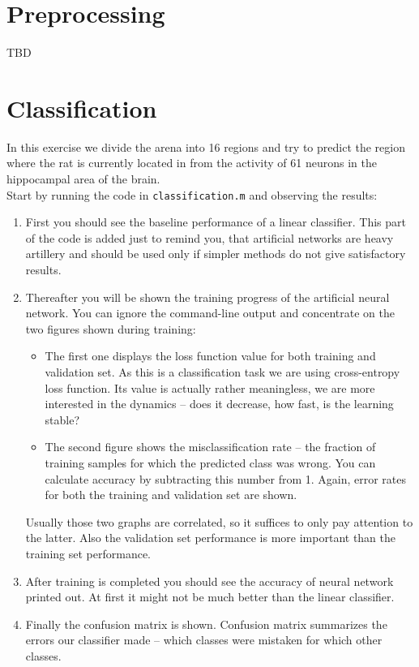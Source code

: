 \documentclass[a4paper,11pt]{article}
\begin{document}
\section{Preprocessing}

TBD

\newpage

%
%
\section{Classification}

In this exercise we divide the arena into 16 regions and try to predict the region where the rat is currently located in from the activity of 61 neurons in the hippocampal area of the brain.\\

Start by running the code in \texttt{classification.m} and observing the results:

\begin{enumerate}
	\item First you should see the baseline performance of a linear classifier. This part of the code is added just to remind you, that artificial networks are heavy artillery and should be used only if simpler methods do not give satisfactory results. 
	\item Thereafter you will be shown the training progress of the artificial neural network. You can ignore the command-line output and concentrate on the two figures shown during training:
	\begin{itemize}
		\item The first one displays the loss function value for both training and validation set. As this is a classification task we are using cross-entropy loss function. Its value is actually rather meaningless, we are more interested in the dynamics -- does it decrease, how fast, is the learning stable?
		\item The second figure shows the misclassification rate -- the fraction of training samples for which the predicted class was wrong. You can calculate accuracy by subtracting this number from 1. Again, error rates for both the training and validation set are shown.
	\end{itemize}
	Usually those two graphs are correlated, so it suffices to only pay attention to the latter. Also the validation set performance is more important than the training set performance.
	\item After training is completed you should see the accuracy of neural network printed out. At first it might not be much better than the linear classifier.
	\item Finally the confusion matrix is shown. Confusion matrix summarizes the errors our classifier made -- which classes were mistaken for which other classes.
\end{enumerate}
\end{document}

